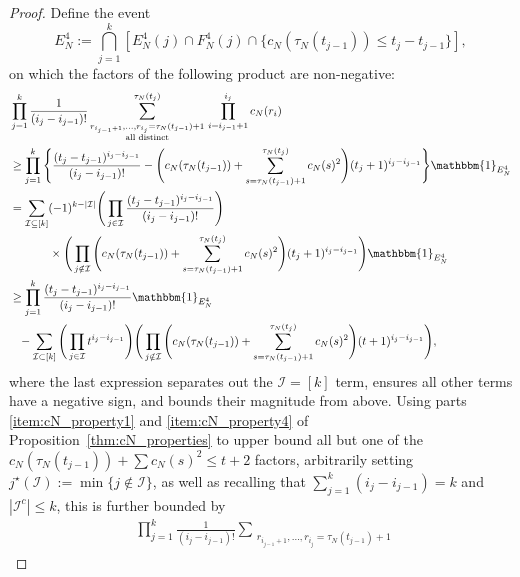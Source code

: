 \documentclass[12pt,authoryear]{article}
\theoremstyle{definition}
\newcommand{\1}[1]{\mathbbm{1}_{#1}}
\begin{document}
\begin{proof}
Define the event 
\begin{equation*}
    E_N^4 := \bigcap_{j=1}^k [E_N^4(j) \cap F_N^4(j) \cap \{c_N(\tau_N(t_{j-1})) \leq t_j - t_{j - 1}\}],
\end{equation*}
on which the factors of the following product are non-negative:
\begin{align*}
&\prod_{j=1}^k \frac{1}{(i_j - i_{j-1})!}
        \sum_{\substack{ r_{i_{j-1}+1}, \ldots, r_{i_j} = \tau_N(t_{j-1})+1 
        \\ \text{all distinct} }}^{\tau_N(t_j)} 
        \,\prod_{i=i_{j-1}+1}^{i_j} c_N(r_i) \\
&\geq \prod_{j=1}^k \Bigg\{ \frac{(t_j - t_{j-1})^{i_j - i_{j-1}}}{(i_j - i_{j-1})!}  - \Bigg( c_N(\tau_N(t_{j-1})) + \sum_{s=\tau_N(t_{j-1})+1}^{\tau_N(t_j)} c_N(s)^2 \Bigg)
        ( t_j +1 )^{i_j - i_{j-1}} \Bigg\} \1{E_N^4} \\
&= \sum_{\mathcal{I} \subseteq [k]} (-1)^{k-|\mathcal{I}|} 
        \Bigg( \prod_{j\in\mathcal{I}} \frac{(t_j - t_{j-1})^{i_j - i_{j-1}}}
        {(i_j - i_{j-1})!} \Bigg) \\
    &\phantom{\geq \prod_{j=1}^k \Bigg\{} \times \Bigg( \prod_{j\notin\mathcal{I}} \Bigg( c_N(\tau_N(t_{j - 1})) +
        \sum_{s=\tau_N(t_{j-1})+1}
        ^{\tau_N(t_j)} c_N(s)^2 \Bigg) ( t_j +1 )^{i_j - i_{j-1}} \Bigg) 
        \1{E_N^4} \\
&\geq \prod_{j=1}^k \frac{(t_j - t_{j-1})^{i_j - i_{j-1}}}{(i_j - i_{j-1})!} 
        \1{E_N^4} \notag\\
    &\phantom{=}- \sum_{\mathcal{I} \subset [k]} \Bigg( \prod_{j\in\mathcal{I}} 
        t^{i_j - i_{j-1}} \Bigg) 
        \Bigg( \prod_{j\notin\mathcal{I}} \Bigg( c_N(\tau_N(t_{j - 1} )) + \sum_{s=\tau_N(t_{j-1})+1}
        ^{\tau_N(t_j)} c_N(s)^2 \Bigg) ( t+1 )^{i_j - i_{j-1}} \Bigg),
\end{align*}
where the last expression separates out the $\mathcal{I} = [k]$ term, ensures all other terms have a negative sign, and bounds their magnitude from above.
Using parts \ref{item:cN_property1} and \ref{item:cN_property4} of Proposition~\ref{thm:cN_properties} to upper bound all but one of the $c_N(\tau_N(t_{j-1})) + \sum c_N(s)^2 \leq t + 2$ factors, arbitrarily setting $j^\star(\mathcal{I}) := \min\{j \notin \mathcal{I} \}$, as well as recalling that $\sum_{ j = 1 }^k (i_j - i_{j - 1}) = k$ and $|\mathcal{I}^c| \leq k$, this is further bounded by
\begin{align*}
&\prod_{j=1}^k \frac{1}{(i_j - i_{j-1})!}
        \sum_{\substack{ r_{i_{j-1}+1}, \ldots, r_{i_j} = \tau_N(t_{j-1})+1 
}}
\end{align*}
\end{proof}
\end{document}
